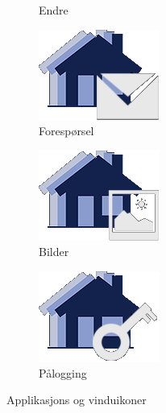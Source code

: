 \begin{figure}[ht!]
\begin{subfigure}[b]{0.2\textwidth}
\caption{Endre}
\end{subfigure}
\quad
\begin{subfigure}[b]{0.2\textwidth}
\centering
\includegraphics[scale=0.4]{./img/produktdokumentasjon/visuelle_detaljer/foresporsel.png}
\caption{Forespørsel}
\end{subfigure}
\quad
\begin{subfigure}[b]{0.2\textwidth}
\centering
\includegraphics[scale=0.4]{./img/produktdokumentasjon/visuelle_detaljer/bildevindu.png}
\caption{Bilder}
\end{subfigure}
\quad
\begin{subfigure}[b]{0.2\textwidth}
\centering
\includegraphics[scale=0.4]{./img/produktdokumentasjon/visuelle_detaljer/passord.png}
\caption{Pålogging}
\end{subfigure}
\quad
\caption{Applikasjons og vinduikoner}\label{fig:appikoner}
\end{figure}